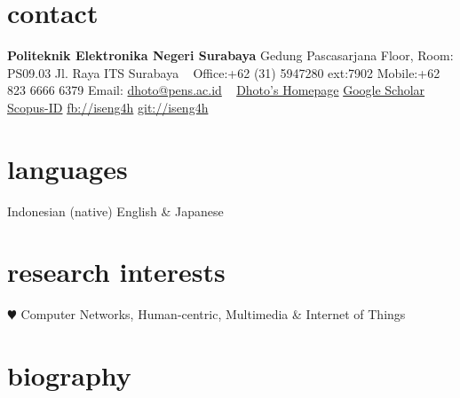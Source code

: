 \documentclass[]{friggeri-cv} %
\begin{document}


\begin{aside} %
\section{contact}
\textbf{Politeknik Elektronika Negeri Surabaya}
Gedung Pascasarjana  Floor, Room: PS09.03
Jl. Raya ITS Surabaya
~
Office:+62 (31) 5947280 ext:7902
Mobile:+62 823 6666 6379
Email: \href{mailto:dhoto@pens.ac.id}{dhoto@pens.ac.id}
~
\href{http://dhoto.lecturer.pens.ac.id/}{Dhoto's Homepage}
\href{https://scholar.google.co.id/citations?user=M6sGfNQAAAAJ&hl=en&oi=ao}{Google Scholar}
\href{https://www.scopus.com/authid/detail.uri?authorId=35100882700}{Scopus-ID}
\href{http://facebook.com/iseng4h}{fb://iseng4h}
\href{http://github.com/iseng4h}{git://iseng4h}
\section{languages}
Indonesian (native)
English \& Japanese 
\section{research interests}
{\color{red} $\varheartsuit$} Computer Networks,
Human-centric, Multimedia \& Internet of Things
\end{aside}


\section{biography}
\end{document}
